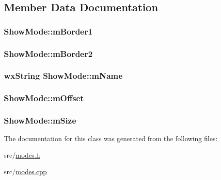 \subsection{Member Data Documentation}
\hypertarget{a00140_aa176835c9d17912af7f8bf93996641c4}{
\subsubsection[{m\-Border1}]{ Show\-Mode\-::m\-Border1\hspace{0.3cm}{\ttfamily [protected]}}}\label{a00140_aa176835c9d17912af7f8bf93996641c4}
\hypertarget{a00140_a85badafc6653affd2cae0cdf3065da18}{
\subsubsection[{m\-Border2}]{ Show\-Mode\-::m\-Border2\hspace{0.3cm}{\ttfamily [protected]}}}\label{a00140_a85badafc6653affd2cae0cdf3065da18}
\hypertarget{a00140_a5cc015d76e3c8b2eb1d8506946484f1c}{
\subsubsection[{m\-Name}]{\setlength{\rightskip}{0pt plus 5cm}wx\-String Show\-Mode\-::m\-Name\hspace{0.3cm}{\ttfamily [private]}}}\label{a00140_a5cc015d76e3c8b2eb1d8506946484f1c}
\hypertarget{a00140_a604232d52fdedc70d6de9aea88ef47b2}{
\subsubsection[{m\-Offset}]{ Show\-Mode\-::m\-Offset\hspace{0.3cm}{\ttfamily [protected]}}}\label{a00140_a604232d52fdedc70d6de9aea88ef47b2}
\hypertarget{a00140_a6382d3ac8f5c3ba0c451f60e1cb5d044}{
\subsubsection[{m\-Size}]{ Show\-Mode\-::m\-Size\hspace{0.3cm}{\ttfamily [protected]}}}\label{a00140_a6382d3ac8f5c3ba0c451f60e1cb5d044}


The documentation for this class was generated from the following files\-:\begin{DoxyCompactItemize}
\item 
src/\hyperlink{a00236}{modes.\-h}\item 
src/\hyperlink{a00235}{modes.\-cpp}\end{DoxyCompactItemize}

